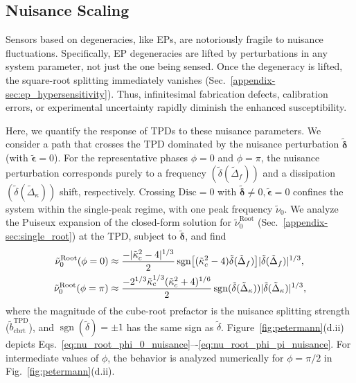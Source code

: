 \documentclass[%
  reprint,
  amsmath,amssymb,
  aps,
  prapplied,
  superscriptaddress,
  longbibliography]{revtex4-2}
\begin{document}
\subsection{\label{subsec:nuisance_scaling}Nuisance Scaling}

Sensors based on degeneracies, like EPs, are notoriously fragile to nuisance fluctuations. Specifically, EP degeneracies are lifted by perturbations in any system parameter, not just the one being sensed. Once the degeneracy is lifted, the square-root splitting immediately vanishes (Sec.~\ref{appendix-sec:ep_hypersensitivity}). Thus, infinitesimal fabrication defects, calibration errors, or experimental uncertainty rapidly diminish the enhanced susceptibility. 

Here, we quantify the response of TPDs to these nuisance parameters. We consider a path that crosses the TPD dominated by the nuisance perturbation $\boldsymbol{\tilde{\delta}}$ (with $\boldsymbol{\tilde{\epsilon}} = 0$). For the representative phases $\phi=0$ and $\phi=\pi$, the nuisance perturbation corresponds purely to a frequency $(\tilde{\delta}(\tilde{\Delta}_f))$ and a dissipation $(\tilde{\delta}(\tilde{\Delta}_\kappa))$ shift, respectively. Crossing $\mathrm{Disc} = 0$ with $\boldsymbol{\tilde{\delta}} \neq 0, \boldsymbol{\tilde{\epsilon}} = 0$ confines the system within the single-peak regime, with one peak frequency $\tilde{\nu}_0$. We analyze the Puiseux expansion of the closed-form solution for $\tilde{\nu}_0^\text{Root}$ (Sec.~\ref{appendix-sec:single_root}) at the TPD, subject to $\boldsymbol{\tilde{\delta}}$, and find 
\begingroup
\small
\begin{align}
    \tilde{\nu}_0^\text{Root}(\phi = 0) &\approx \frac{-\lvert \tilde{\kappa}_c^2 - 4\rvert^{1/3}}{2} \operatorname{sgn}\bigl{[}(\tilde{\kappa}_c^2 - 4)\tilde{\delta}(\tilde{\Delta}_f)\bigr{]} \lvert \tilde{\delta}(\tilde{\Delta}_f) \rvert^{1/3},\label{eq:nu_root_phi_0_nuisance} \\
    \tilde{\nu}_0^\text{Root}(\phi = \pi) &\approx \frac{-2^{1/3} \tilde{\kappa}_c^{1/3} (\tilde{\kappa}_c^2 + 4)^{1/6}}{2} \operatorname{sgn}(\tilde{\delta}(\tilde{\Delta}_\kappa))\lvert \tilde{\delta}(\tilde{\Delta}_\kappa) \rvert^{1/3},\label{eq:nu_root_phi_pi_nuisance}
\end{align}
\endgroup
where the magnitude of the cube-root prefactor is the nuisance splitting strength ($\tilde{b}_{\mathrm{cbrt}}^{\mathrm{TPD}}$), and $\operatorname{sgn}(\tilde{\delta})=\pm 1$ has the same sign as $\tilde{\delta}$. Figure~\ref{fig:petermann}(d.ii) depicts Eqs.~\ref{eq:nu_root_phi_0_nuisance}–-\ref{eq:nu_root_phi_pi_nuisance}. For intermediate values of $\phi$, the behavior is analyzed numerically for $\phi=\pi/2$ in Fig.~\ref{fig:petermann}(d.ii).
\end{document}
